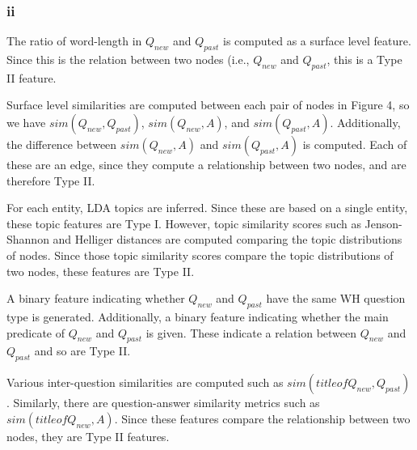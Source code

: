 \documentclass[paper=a4, fontsize=11pt]{scrartcl}
\begin{document}
\subsubsection*{ii}

The ratio of word-length in $Q_{new}$ and $Q_{past}$ is computed as a surface
level feature. Since this is the relation between two nodes (i.e., $Q_{new}$
and $Q_{past}$, this is a Type II feature.

Surface level similarities are computed between each pair of nodes in Figure
4, so we have $sim(Q_{new}, Q_{past})$, $sim(Q_{new}, A)$, and $sim(Q_{past},
A)$. Additionally, the difference between $sim(Q_{new}, A)$ and $sim(Q_{past},
A)$ is computed. Each of these are an edge, since they compute a relationship
between two nodes, and are therefore Type II.

For each entity, LDA topics are inferred. Since these are based on a single
entity, these topic features are Type I. However, topic similarity scores such
as Jenson-Shannon and Helliger distances are computed comparing the topic
distributions of nodes. Since those topic similarity scores compare the topic
distributions of two nodes, these features are Type II.

A binary feature indicating whether $Q_{new}$ and $Q_{past}$ have the same WH
question type is generated. Additionally, a binary feature indicating whether
the main predicate of $Q_{new}$ and $Q_{past}$ is given. These indicate a
relation between $Q_{new}$ and $Q_{past}$ and so are Type II.

Various inter-question similarities are computed such as $sim(title of
Q_{new}, Q_{past})$. Similarly, there are question-answer similarity metrics
such as $sim(title of Q_{new}, A)$.
Since these features compare the relationship between two
nodes, they are Type II features.
\end{document}
